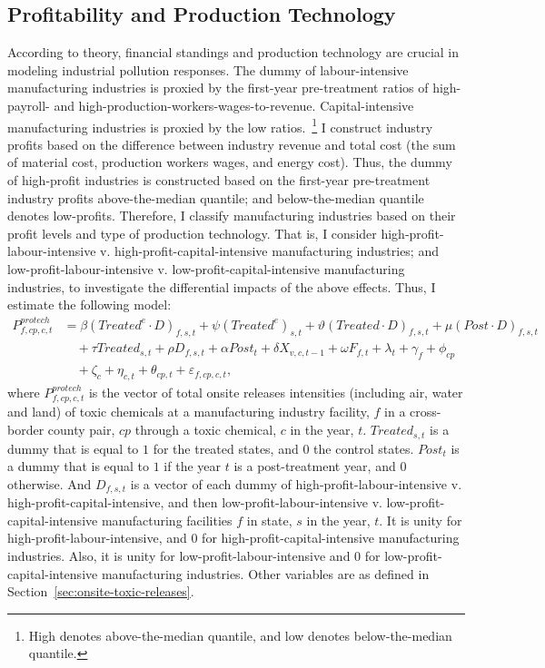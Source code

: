 \documentclass[12pt, english]{article}
\begin{document}
    \subsection{Profitability and Production Technology}\label{subsec:profitability-and-production-technology}
    According to theory, financial standings and production technology are crucial in modeling industrial pollution responses. The dummy of labour-intensive manufacturing industries is proxied by the first-year pre-treatment ratios of high-payroll- and high-production-workers-wages-to-revenue. Capital-intensive manufacturing industries is proxied by the low ratios.~\footnote{High denotes above-the-median quantile, and low denotes below-the-median quantile.} I construct industry profits based on the difference between industry revenue and total cost (the sum of material cost, production workers wages, and energy cost). Thus, the dummy of high-profit industries is constructed based on the first-year pre-treatment industry profits above-the-median quantile; and below-the-median quantile denotes low-profits. Therefore, I classify manufacturing industries based on their profit levels and type of production technology. That is, I consider high-profit-labour-intensive v. high-profit-capital-intensive manufacturing industries; and low-profit-labour-intensive v. low-profit-capital-intensive manufacturing industries, to investigate the differential impacts of the above effects. Thus, I estimate the following model:
    \begin{align}
        P_{f,cp,c,t}^{protech} &= \beta (Treated^{e} \cdot D)_{f,s,t} + \psi (Treated^{e})_{s,t} + \vartheta (Treated \cdot D)_{f,s,t} + \mu (Post \cdot D)_{f,s,t} \nonumber \\
        &\quad + \tau Treated_{s,t} + \rho D_{f,s,t} + \alpha Post_{t} + \delta X_{v,c,t-1} + \omega F_{f,t} + \lambda_{t} + \gamma_{f} + \phi_{cp} \nonumber \\
        &\quad + \zeta_{c} + \eta_{c,t} + \theta_{cp,t} + \varepsilon_{f,cp,c,t},\label{eq:heterogeneous-onsite-releases-intensity-protech}
    \end{align}
    where $P_{f,cp,c,t}^{protech}$ is the vector of total onsite releases intensities (including air, water and land) of toxic chemicals at a manufacturing industry facility, $f$ in a cross-border county pair, $cp$ through a toxic chemical, $c$ in the year, $t$. $Treated_{s,t}$ is a dummy that is equal to $1$ for the treated states, and $0$ the control states. $Post_{t}$ is a dummy that is equal to $1$ if the year $t$ is a post-treatment year, and $0$ otherwise. And $D_{f,s,t}$ is a vector of each dummy of high-profit-labour-intensive v. high-profit-capital-intensive, and then low-profit-labour-intensive v. low-profit-capital-intensive manufacturing facilities $f$ in state, $s$ in the year, $t$. It is unity for high-profit-labour-intensive, and $0$ for high-profit-capital-intensive manufacturing industries. Also, it is unity for low-profit-labour-intensive and $0$ for low-profit-capital-intensive manufacturing industries. Other variables are as defined in Section~\ref{sec:onsite-toxic-releases}.
\end{document}
